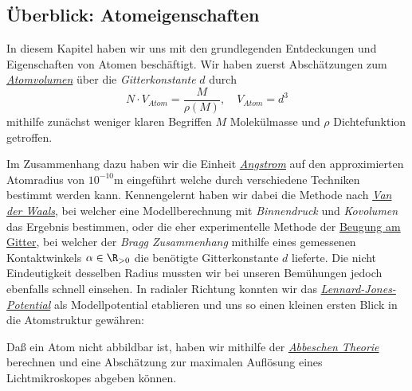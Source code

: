 \documentclass{subfiles}
\begin{document}
    \subsection{Überblick: Atomeigenschaften}\label{Ub:AtomEigenschaften}
    In diesem Kapitel haben wir uns mit den grundlegenden Entdeckungen und Eigenschaften von Atomen beschäftigt. Wir haben zuerst Abschätzungen zum \hyperref[Ub:Atomvolumen]{\emph{Atomvolumen}} über die \emph{Gitterkonstante} $d$ durch 
    \[
        N\cdot V_{\textit{Atom}}=\frac{M}{\rho(M)},\quad V_{\textit{Atom}}=d^3
    \]
    mithilfe zunächst weniger klaren Begriffen $M$ Molekülmasse und $\rho$ Dichtefunktion getroffen.

    Im Zusammenhang dazu haben wir die Einheit \hyperref[Ub:Angstrom]{\emph{Angstrom}} auf den approximierten Atomradius von $10^{-10}\si\metre$ eingeführt welche durch verschiedene Techniken bestimmt werden kann. Kennengelernt haben wir dabei die Methode nach \hyperref[Ub:VanDerWaals]{\emph{Van der Waals}}, bei welcher eine Modellberechnung mit \emph{Binnendruck} und \emph{Kovolumen} das Ergebnis bestimmen, oder die eher experimentelle Methode der \hyperref[Ub:BeugungAmGitter]{Beugung am Gitter}, bei welcher der \emph{Bragg Zusammenhang} mithilfe eines gemessenen Kontaktwinkels $\alpha\in\R_{>0}$ die benötigte Gitterkonstante $d$ lieferte. Die nicht Eindeutigkeit desselben Radius mussten wir bei unseren Bemühungen jedoch ebenfalls schnell einsehen. In radialer Richtung konnten wir das \hyperref[Ub:DefAtomRadius]{\emph{Lennard-Jones-Potential}} als Modellpotential etablieren und uns so einen kleinen ersten Blick in die Atomstruktur gewähren:
    \begin{figure}[H]
        \centering
    \end{figure}

    Daß ein Atom nicht abbildbar ist, haben wir mithilfe der \hyperref[Ub:AbbescheTheorie]{\emph{Abbeschen Theorie}} berechnen und eine Abschätzung zur maximalen Auflösung eines Lichtmikroskopes abgeben können.
\end{document}
